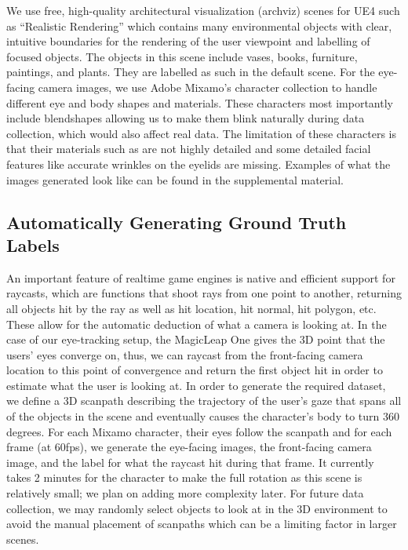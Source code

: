 We use free, high-quality architectural visualization (archviz) scenes for UE4 such as ``Realistic Rendering'' which contains many environmental objects with clear, intuitive boundaries for the rendering of the user viewpoint and labelling of focused objects. The objects in this scene include vases, books, furniture, paintings, and plants. They are labelled as such in the default scene. For the eye-facing camera images, we use Adobe Mixamo's character collection to handle different eye and body shapes and materials. These characters most importantly include blendshapes allowing us to make them blink naturally during data collection, which would also affect real data. The limitation of these characters is that their materials such as are not highly detailed and some detailed facial features like accurate wrinkles on the eyelids are missing. Examples of what the images generated look like can be found in the supplemental material.
\subsection{Automatically Generating Ground Truth Labels}
An important feature of realtime game engines is native and efficient support for raycasts, which are functions that shoot rays from one point to another, returning all objects hit by the ray as well as hit location, hit normal, hit polygon, etc. These allow for the automatic deduction of what a camera is looking at. In the case of our eye-tracking setup, the MagicLeap One gives the 3D point that the users' eyes converge on, thus, we can raycast from the front-facing camera location to this point of convergence and return the first object hit in order to estimate what the user is looking at.
\newline\indent In order to generate the required dataset, we define a 3D scanpath describing the trajectory of the user's gaze that spans all of the objects in the scene and eventually causes the character's body to turn 360 degrees. For each Mixamo character, their eyes follow the scanpath and for each frame (at 60fps), we generate the eye-facing images, the front-facing camera image, and the label for what the raycast hit during that frame. It currently takes 2 minutes for the character to make the full rotation as this scene is relatively small; we plan on adding more complexity later. For future data collection, we may randomly select objects to look at in the 3D environment to avoid the manual placement of scanpaths which can be a limiting factor in larger scenes.
